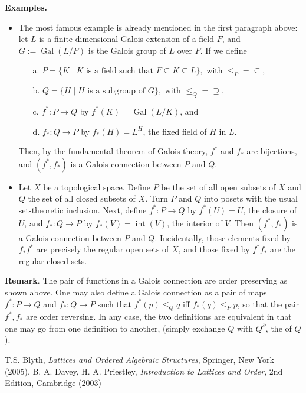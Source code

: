 \documentclass[12pt]{article}
\begin{document}
\textbf{Examples.}
\begin{itemize}
\item The most famous example is already mentioned in the first paragraph above: let $L$ is a finite-dimensional Galois extension of a field $F$, and $G:=\operatorname{Gal}(L/F)$ is the Galois group of $L$ over $F$.  If we define
\begin{itemize}
\item[a.] $P=\lbrace K\mid K\mbox{ is a field such that }F\subseteq K\subseteq L \rbrace,$ with $\leq_P=\subseteq$,
\item[b.] $Q=\lbrace H\mid H\mbox{ is a subgroup of }G \rbrace,$ with $\leq_Q=\supseteq$,
\item[c.] $f^*:P\to Q$ by $f^*(K)=\operatorname{Gal}(L/K)$, and \item[d.] $f_*:Q\to P$ by $f_*(H)=L^H$, the fixed field of $H$ in $L$.
\end{itemize}
Then, by the fundamental theorem of Galois theory, $f^*$ and $f_*$ are bijections, and $(f^*,f_*)$ is a Galois connection between $P$ and $Q$.
\item Let $X$ be a topological space.  Define $P$ be the set of all open subsets of $X$ and $Q$ the set of all closed subsets of $X$. Turn $P$ and $Q$ into posets with the usual set-theoretic inclusion. Next, define $f^*:P\to Q$ by $f^*(U)=\overline{U}$, the closure of $U$, and $f_*:Q\to P$ by $f_*(V)=\operatorname{int}(V)$, the interior of $V$.  Then $(f^*,f_*)$ is a Galois connection between $P$ and $Q$.  Incidentally, those elements fixed by $f_*f^*$ are precisely the regular open sets of $X$, and those fixed by $f^*f_*$ are the regular closed sets.
\end{itemize}

\textbf{Remark}.  The pair of functions in a Galois connection are order preserving as shown above.  One may also define a Galois connection as a pair of maps $f^*:P\to Q$ and $f_*:Q\to P$ such that $f^*(p)\le_Q q$ iff $f_*(q)\le_P p$, so that the pair $f^*,f_*$ are order reversing.  In any case, the two definitions are equivalent in that one may go from one definition to another, (simply exchange $Q$ with $Q^{\partial}$, the  of $Q$).

\begin{thebibliography}{6}
 T.S. Blyth, {\em Lattices and Ordered Algebraic Structures}, Springer, New York (2005).
 B. A. Davey, H. A. Priestley, {\it Introduction to Lattices and Order}, 2nd Edition, Cambridge (2003)
\end{thebibliography}
\end{document}
